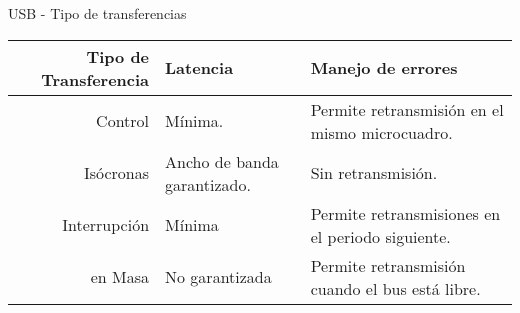\begin{frame}{USB - Tipo de transferencias}
	\centering
	\begin{tabulary}{\textwidth}{|R||L|L|}
		\hline
		{Tipo de Transferencia}&Latencia&Manejo de errores\\
		\hline Control&Mínima.&Permite retransmisión en el mismo microcuadro.\\
		Isócronas&Ancho de banda garantizado.&Sin retransmisión.\\
		Interrupción&Mínima&Permite retransmisiones en el periodo siguiente.\\
		en Masa&No garantizada&Permite retransmisión cuando el bus está libre.\\
		\hline
	\end{tabulary}
\end{frame}
